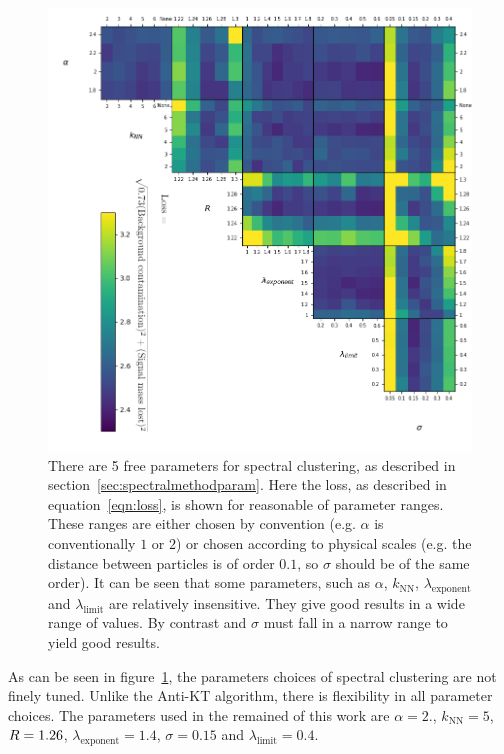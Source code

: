     \begin{figure}[htp]
            \includegraphics[width=1\textwidth]{graphics/trangle_scan_incomplete.png}
            \caption{There are 5 free parameters for spectral clustering,
                as described in section~\ref{sec:spectralmethodparam}.
                Here the loss, as described in equation~\ref{eqn:loss}, is shown for reasonable of parameter ranges.
                These ranges are either chosen by convention (e.g. \(\alpha\) is conventionally \(1\) or \(2\))
                or chosen according to physical scales (e.g. the distance between particles is of order \(0.1\),
                so \(\sigma\) should be of the same order).
                It can be seen that some parameters, such as \(\alpha\), \(k_\text{NN}\), \(\lambda_\text{exponent}\)
                and \(\lambda_\text{limit}\) are relatively insensitive.
                They give good results in a wide range of values.
                By contrast \stoppingdeltar{} and \(\sigma\) must fall in a narrow range to yield good results.
             }\label{fig:scan_spectral}
    \end{figure}    

    As can be seen in figure~\ref{fig:scan_spectral}, the parameters choices of spectral clustering are not finely tuned.
    Unlike the Anti-KT algorithm, there is flexibility in all parameter choices.
    The parameters used in the remained of this work are \(\alpha=2.\), \(k_\text{NN}=5\), \(R{} = 1.26\), \(\lambda_\text{exponent} = 1.4\), \(\sigma = 0.15\) and \(\lambda_\text{limit} = 0.4\).
